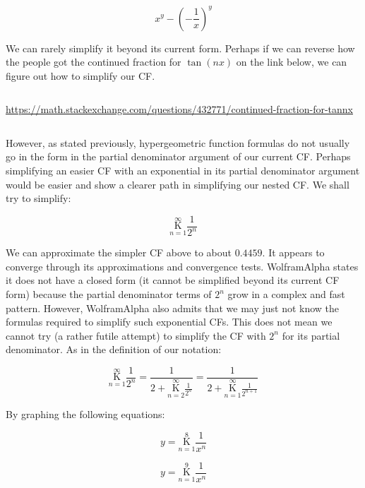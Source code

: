 \documentclass{article}
\begin{document}
$$x^y - (-\frac{1}{x})^y$$

We can rarely simplify it beyond its current form. Perhaps if we can reverse how the people got the continued fraction for $\tan(nx)$ on the link below, we can figure out how to simplify our CF.

$${}$$

\url{https://math.stackexchange.com/questions/432771/continued-fraction-for-tannx}

$${}$$

However, as stated previously, hypergeometric function formulas do not usually go in the form in the partial denominator argument of our current CF. Perhaps simplifying an easier CF with an exponential in its partial denominator argument would be easier and show a clearer path in simplifying our nested CF. We shall try to simplify:

$$\underset{n=1}{\overset{\infty}{ \mathrm K}} \frac{1}{2^n}$$

We can approximate the simpler CF above to about $0.4459$. It appears to converge through its approximations and convergence tests. WolframAlpha states it does not have a closed form (it cannot be simplified beyond its current CF form) because the partial denominator terms of $2^n$ grow in a complex and fast pattern. However, WolframAlpha also admits that we may just not know the formulas required to simplify such exponential CFs. This does not mean we cannot try (a rather futile attempt) to simplify the CF with $2^n$ for its partial denominator. As in the definition of our notation:

$$\underset{n=1}{\overset{\infty}{ \mathrm K}} \frac{1}{2^n}=\frac{1}{2+\underset{n=2}{\overset{\infty}{ \mathrm K}} \frac{1}{2^n}}=\frac{1}{2+\underset{n=1}{\overset{\infty}{ \mathrm K}} \frac{1}{2^{n+1}}}$$

By graphing the following equations:

$$y=\underset{n=1}{\overset{8}{ \mathrm K}} \frac{1}{x^n}$$

$$y=\underset{n=1}{\overset{9}{ \mathrm K}} \frac{1}{x^n}$$
\end{document}
